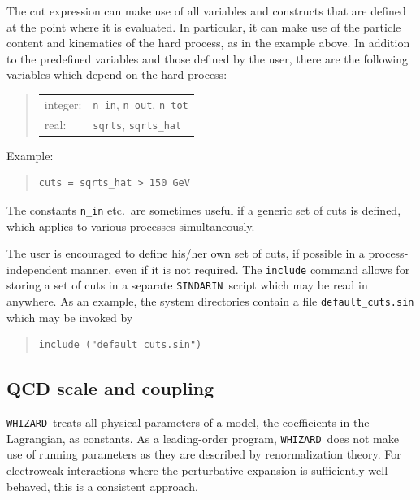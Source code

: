 \documentclass[12pt]{book}
\newcommand{\ttt}[1]{\texttt{#1}}
\newcommand{\whizard}{\ttt{WHIZARD}}
\newcommand{\sindarin}{\ttt{SINDARIN}}
\begin{document}
The cut expression can make use of all variables and constructs that are
defined at the point where it is evaluated.  In particular, it can make use of
the particle content and kinematics of the hard process, as in the example
above.  In addition to the predefined variables and those defined by the user,
there are the following variables which depend on the hard process:
\begin{quote}
\begin{tabular}{ll}
integer: & \ttt{n\_in}, \ttt{n\_out}, \ttt{n\_tot} \\
real: & \ttt{sqrts}, \ttt{sqrts\_hat}
\end{tabular}
\end{quote}
Example:
\begin{quote}
\begin{footnotesize}
\begin{verbatim}
cuts = sqrts_hat > 150 GeV
\end{verbatim}
\end{footnotesize}
\end{quote}
The constants \ttt{n\_in} etc.\ are sometimes useful if a generic set of cuts
is defined, which applies to various processes simultaneously.

The user is encouraged to define his/her own set of cuts, if possible in a
process-independent manner, even if it is not required.  The \ttt{include}
command allows for storing a set of cuts in a separate \sindarin\ script which
may be read in anywhere.  As an example, the system directories contain a file
\verb|default_cuts.sin| which may be invoked by
\begin{quote}
\begin{footnotesize}
\begin{verbatim}
include ("default_cuts.sin")
\end{verbatim}
\end{footnotesize}
\end{quote}


\subsection{QCD scale and coupling}

\whizard\ treats all physical parameters of a model, the coefficients in the
Lagrangian, as constants.  As a leading-order program, \whizard\ does not make
use of running parameters as they are described by renormalization theory.
For electroweak interactions where the perturbative expansion is sufficiently
well behaved, this is a consistent approach.
\end{document}
